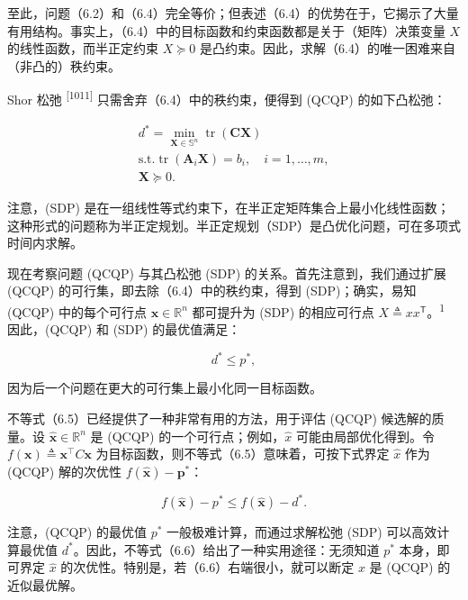 至此，问题（6.2）和（6.4）完全等价；但表述（6.4）的优势在于，它揭示了大量有用结构。事实上，（6.4）中的目标函数和约束函数都是关于（矩阵）决策变量 $X$ 的线性函数，而半正定约束 $X \succeq 0$ 是凸约束。因此，求解（6.4）的唯一困难来自（非凸的）秩约束。

Shor 松弛 \textsuperscript{[1011]} 只需舍弃（6.4）中的秩约束，便得到 (QCQP) 的如下凸松弛：

\begin{equation}
\begin{array}{c} d ^ {*} = \min _ {\boldsymbol {X} \in \mathbb {S} ^ {n}} \operatorname{tr} (\boldsymbol {C X}) \\ \text {s.t.} \operatorname{tr} (\boldsymbol {A} _ {i} \boldsymbol {X}) = b _ {i}, \quad i = 1, \ldots , m, \\ \boldsymbol {X} \succeq 0. \end{array}\tag{SDP}
\end{equation}

注意，(SDP) 是在一组线性等式约束下，在半正定矩阵集合上最小化线性函数；这种形式的问题称为半正定规划。半正定规划（SDP）是凸优化问题，可在多项式时间内求解。

现在考察问题 (QCQP) 与其凸松弛 (SDP) 的关系。首先注意到，我们通过扩展 (QCQP) 的可行集，即去除（6.4）中的秩约束，得到 (SDP)；确实，易知 (QCQP) 中的每个可行点 $\mathbf { x } \in \mathbb { R } ^ { n }$ 都可提升为 (SDP) 的相应可行点 $X \triangleq x x ^ { \mathsf { T } }$。\textsuperscript{1} 因此，(QCQP) 和 (SDP) 的最优值满足：

\begin{equation}
d ^ {*} \leq p ^ {*},\tag{6.5}
\end{equation}

因为后一个问题在更大的可行集上最小化同一目标函数。

不等式（6.5）已经提供了一种非常有用的方法，用于评估 (QCQP) 候选解的质量。设 $\hat { \pmb x } \in \mathbb { R } ^ { n }$ 是 (QCQP) 的一个可行点；例如，$\hat{x}$ 可能由局部优化得到。令 $f ( \pmb { x } ) \triangleq \pmb { x } ^ { \top } C \pmb { x }$ 为目标函数，则不等式（6.5）意味着，可按下式界定 $\hat{x}$ 作为 (QCQP) 解的次优性 $f ( \hat { \pmb x } ) - \boldsymbol p ^ { * }$：

\begin{equation}
f (\hat {\boldsymbol {x}}) - p ^ {*} \leq f (\hat {\boldsymbol {x}}) - d ^ {*}.\tag{6.6}
\end{equation}

注意，(QCQP) 的最优值 $p ^ { * }$ 一般极难计算，而通过求解松弛 (SDP) 可以高效计算最优值 $d ^ { * }$。因此，不等式（6.6）给出了一种实用途径：无须知道 $p ^ { * }$ 本身，即可界定 $\hat{x}$ 的次优性。特别是，若（6.6）右端很小，就可以断定 $x$ 是 (QCQP) 的近似最优解。

